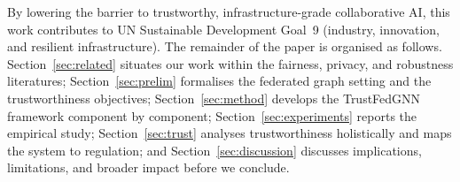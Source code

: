 By lowering the barrier to trustworthy, infrastructure-grade collaborative AI,
this work contributes to UN Sustainable Development Goal~9 (industry,
innovation, and resilient infrastructure). The remainder of the paper is
organised as follows. Section~\ref{sec:related} situates our work within the
fairness, privacy, and robustness literatures; Section~\ref{sec:prelim}
formalises the federated graph setting and the trustworthiness objectives;
Section~\ref{sec:method} develops the TrustFedGNN framework component by
component; Section~\ref{sec:experiments} reports the empirical study;
Section~\ref{sec:trust} analyses trustworthiness holistically and maps the
system to regulation; and Section~\ref{sec:discussion} discusses implications,
limitations, and broader impact before we conclude.
